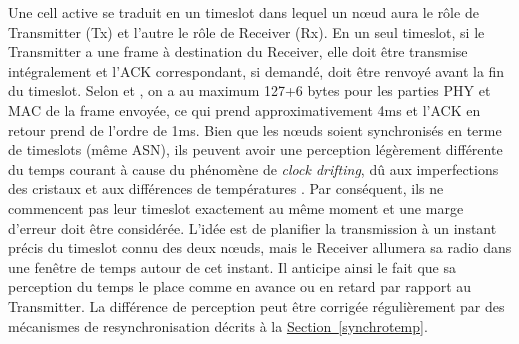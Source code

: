 \documentclass[]{report}
\newcommand{\wordlink}[2]{\hyperref[#2]{#1~\ref{#2}}}
\begin{document}
\par Une cell active se traduit en un timeslot dans lequel un nœud aura le rôle de Transmitter (Tx) et l'autre le rôle de Receiver (Rx). En un seul timeslot, si le Transmitter a une frame à destination du Receiver, elle doit être transmise intégralement et l'ACK correspondant, si demandé, doit être renvoyé avant la fin du timeslot. Selon \cite{rfc7554} et \cite{ATP}, on a au maximum 127+6 bytes pour les parties PHY et MAC de la frame envoyée, ce qui prend approximativement 4ms et l'ACK en retour prend de l'ordre de 1ms. Bien que les nœuds soient synchronisés en terme de timeslots (même ASN), ils peuvent avoir une perception légèrement différente du temps courant à cause du phénomène de \textit{clock drifting}, dû aux imperfections des cristaux et aux différences de températures \cite{vulns-time-synchro-TSCH}. Par conséquent, ils ne commencent pas leur timeslot exactement au même moment et une marge d'erreur doit être considérée. L'idée est de planifier la transmission à un instant précis du timeslot connu des deux nœuds, mais le Receiver allumera sa radio dans une fenêtre de temps autour de cet instant. Il anticipe ainsi le fait que sa perception du temps le place comme en avance ou en retard par rapport au Transmitter. La différence de perception peut être corrigée régulièrement par des mécanismes de resynchronisation décrits à la \wordlink{Section}{synchrotemp}.\\

\newpage
\end{document}
